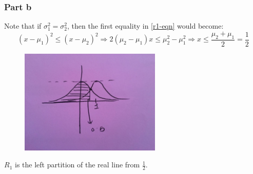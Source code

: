 \documentclass{article}
\begin{document}
\subsubsection*{Part b}
\begin{flushleft}
Note that if \(\sigma_{1}^{2} = \sigma_{2}^{2}\), then the first equality in \ref{r1-eqn} would become:
\begin{equation}
(x - \mu_{1})^{2} \leq (x - \mu_{2})^{2} \Rightarrow 2(\mu_{2} - \mu_{1})x \leq \mu_{2}^{2} - \mu_{1}^{2} \Rightarrow x \leq \frac{\mu_{2} + \mu_{1}}{2} = \frac{1}{2}
\end{equation}

\begin{minipage}{0.475\linewidth}
\begin{figure}[H]
\centering
\includegraphics[width=0.6\textwidth]{./images/4_21_b_sketch.jpg}
\end{figure}
\end{minipage}
\hfill
\begin{minipage}{0.475\linewidth}
\(R_{1}\) is the left partition of the real line from \(\frac{1}{2}\).
\end{minipage}
\end{flushleft}
\end{document}
